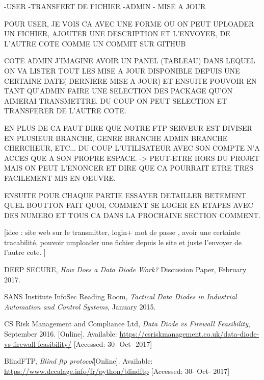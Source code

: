 \documentclass[a4paper,10pt]{article}
\begin{document}
-USER -TRANSFERT DE FICHIER
-ADMIN - MISE A JOUR

POUR USER, JE VOIS CA AVEC UNE FORME OU ON PEUT UPLOADER UN FICHIER, AJOUTER UNE DESCRIPTION ET L'ENVOYER, DE L'AUTRE COTE COMME UN COMMIT SUR GITHUB

COTE ADMIN J'IMAGINE AVOIR UN PANEL (TABLEAU) DANS LEQUEL ON VA LISTER TOUT LES MISE A JOUR DISPONIBLE DEPUIS UNE CERTAINE DATE( DERNIERE MISE A JOUR) ET ENSUITE POUVOIR EN TANT QU'ADMIN FAIRE UNE SELECTION DES PACKAGE QU'ON AIMERAI TRANSMETTRE. DU COUP ON PEUT SELECTION ET TRANSFERER DE L'AUTRE COTE.

EN PLUS DE CA FAUT DIRE QUE NOTRE FTP SERVEUR EST DIVISER EN PLUSIEUR BRANCHE, GENRE BRANCHE ADMIN BRANCHE CHERCHEUR, ETC... DU COUP L'UTILISATEUR AVEC SON COMPTE N'A ACCES QUE A SON PROPRE ESPACE. -> PEUT-ETRE HORS DU PROJET MAIS ON PEUT L'ENONCER ET DIRE QUE CA POURRAIT ETRE TRES FACILEMENT MIS EN OEUVRE.

ENSUITE POUR CHAQUE PARTIE ESSAYER DETAILLER BETEMENT QUEL BOUTTON FAIT QUOI, COMMENT SE LOGER EN ETAPES AVEC DES NUMERO ET TOUS CA DANS LA PROCHAINE SECTION COMMENT.


[idee : site web sur le transmitter, login+ mot de passe , avoir une certainte tracabilité, pouvoir umploader une fichier depuis le site et juste l'envoyer de l'autre cote. ]\\




\begin{thebibliography}{9}


DEEP SECURE,
\textit{How	Does a Data Diode Work?}
Discussion Paper, February 2017.

SANS Institute InfoSec Reading Room,
\textit{Tactical Data Diodes in Industrial Automation and Control Systems}, January 2015.

CS Risk Management and Compliance Ltd,
\textit{Data Diode vs Firewall Feasibility}, September 2016. [Online]. Available: \url{https://csriskmanagement.co.uk/data-diode-vs-firewall-feasibility/} [Accessed: 30- Oct- 2017]

BlindFTP,
\textit{Blind ftp protocol}[Online]. Available: \url{https://www.decalage.info/fr/python/blindftp} [Accessed: 30- Oct- 2017]

\end{thebibliography}
\end{document}
